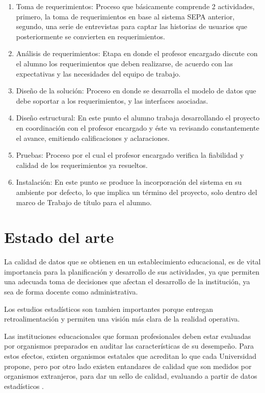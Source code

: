 \documentclass[a4paper,12pt,openany,oneside]{book}
\begin{document}
\begin{enumerate}
\item Toma de requerimientos: Proceso que básicamente comprende 2 actividades, primero, la toma de requerimientos en base al sistema SEPA anterior, segundo, una serie de entrevistas para captar las historias de usuarios que posteriormente se convierten en requerimientos.
\item Análisis de requerimientos: Etapa en donde el profesor encargado discute con el alumno los requerimientos que deben realizarse, de acuerdo con las expectativas y las necesidades del equipo de trabajo.
\item Diseño de la solución: Proceso en donde se desarrolla el modelo de datos que debe soportar a los requerimientos, y las interfaces asociadas.
\item Diseño estructural: En este punto el alumno trabaja desarrollando el proyecto en coordinación con el profesor encargado y éste va revisando constantemente el avance, emitiendo calificaciones y aclaraciones.
\item Pruebas: Proceso por el cual el profesor encargado verifica la fiabilidad y calidad de los requerimientos ya resueltos.
\item Instalación: En este punto se produce la incorporación del sistema en su ambiente por defecto, lo que implica un término del proyecto, solo dentro del marco de Trabajo de título para el alumno.
\end{enumerate}

\section{Estado del arte}
La calidad de datos que se obtienen en un establecimiento educacional, es de vital importancia para la planificación y desarrollo de sus actividades, ya que permiten una adecuada toma de decisiones que afectan el desarrollo de la institución, ya sea de forma docente como administrativa. 

Los estudios estadísticos son tambien importantes porque entregan retroalimentación y permiten una visión más clara de la realidad operativa.

Las instituciones educacionales que forman profesionales deben estar evaluadas por organismos preparados en auditar las características de su desempeño. Para estos efectos, existen organismos estatales que acreditan lo que cada Universidad propone, pero por otro lado existen entandares de calidad que son medidos por organismos extranjeros, para dar un sello de calidad, evaluando a partir de datos estadísticos  \cite{data1}.
\end{document}
